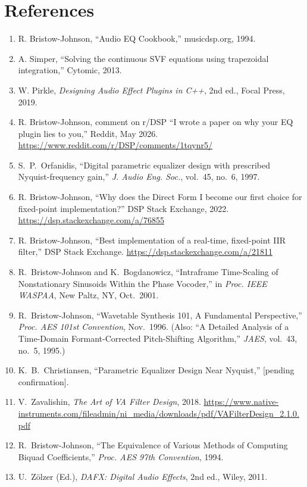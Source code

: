 \documentclass[10pt,twocolumn,a4paper]{article}
\begin{document}
\section*{References}
\begin{enumerate}
\item R. Bristow-Johnson, ``Audio EQ Cookbook,'' musicdsp.org, 1994.
\item A. Simper, ``Solving the continuous SVF equations using trapezoidal integration,'' Cytomic, 2013.
\item W. Pirkle, \textit{Designing Audio Effect Plugins in C++}, 2nd ed., Focal Press, 2019.
\item R. Bristow-Johnson, comment on r/DSP ``I wrote a paper on why your EQ plugin lies to you,'' Reddit, May 2026. \url{https://www.reddit.com/r/DSP/comments/1tqynr5/}
\item S.~P.~Orfanidis, ``Digital parametric equalizer design with prescribed Nyquist-frequency gain,'' \textit{J. Audio Eng. Soc.}, vol.~45, no.~6, 1997.
\item R. Bristow-Johnson, ``Why does the Direct Form I become our first choice for fixed-point implementation?'' DSP Stack Exchange, 2022. \url{https://dsp.stackexchange.com/a/76855}
\item R. Bristow-Johnson, ``Best implementation of a real-time, fixed-point IIR filter,'' DSP Stack Exchange. \url{https://dsp.stackexchange.com/a/21811}
\item R.~Bristow-Johnson and K.~Bogdanowicz, ``Intraframe Time-Scaling of Nonstationary Sinusoids Within the Phase Vocoder,'' in \textit{Proc. IEEE WASPAA}, New Paltz, NY, Oct.\ 2001.
\item R.~Bristow-Johnson, ``Wavetable Synthesis 101, A Fundamental Perspective,'' \textit{Proc. AES 101st Convention}, Nov.\ 1996. (Also: ``A Detailed Analysis of a Time-Domain Formant-Corrected Pitch-Shifting Algorithm,'' \textit{JAES}, vol.~43, no.~5, 1995.)
\item K.~B.~Christiansen, ``Parametric Equalizer Design Near Nyquist,'' [pending confirmation].
\item V.~Zavalishin, \textit{The Art of VA Filter Design}, 2018. \url{https://www.native-instruments.com/fileadmin/ni_media/downloads/pdf/VAFilterDesign_2.1.0.pdf}
\item R.~Bristow-Johnson, ``The Equivalence of Various Methods of Computing Biquad Coefficients,'' \textit{Proc. AES 97th Convention}, 1994.
\item U.~Z{\"o}lzer (Ed.), \textit{DAFX: Digital Audio Effects}, 2nd ed., Wiley, 2011.
\end{enumerate}
\end{document}
